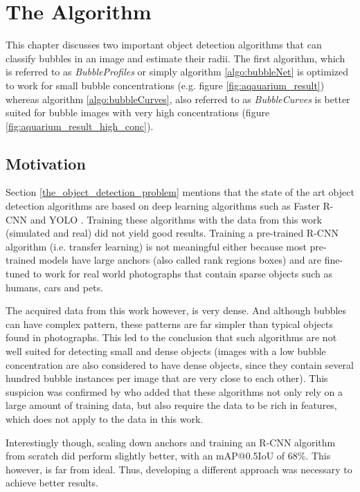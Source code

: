 \chapter{The Algorithm} \label{the_algorithm}
	This chapter discusses two important object detection algorithms that can classify bubbles in an image and estimate their radii. The first algorithm, which is referred to as \textit{BubbleProfiles} or simply algorithm \ref{algo:bubbleNet} is optimized to work for small bubble concentrations (e.g. figure \ref{fig:aqauarium_result}) whereas algorithm \ref{algo:bubbleCurves}, also referred to as \textit{BubbleCurves} is better suited for bubble images with very high concentrations (figure \ref{fig:aquarium_result_high_conc}).
		
	\section{Motivation}
		Section \ref{the_object_detection_problem} mentions that the state of the art object detection algorithms are based on deep learning algorithms such as Faster R-CNN \citep{FasterRCNN} and YOLO \citep{YOLO}. Training these algorithms with the data from this work (simulated and real) did not yield good results. Training a pre-trained R-CNN algorithm (i.e. transfer learning) is not meaningful either because most pre-trained models have large anchors (also called rank regions boxes) and are fine-tuned to work for real world photographs that contain sparse objects such as humans, cars and pets. 
		
		The acquired data from this work however, is very dense. And although bubbles can have complex pattern, these patterns are far simpler than typical objects found in photographs. 
		This led to the conclusion that such algorithms are not well suited for detecting small and dense objects (images with a low bubble concentration are also considered to have dense objects, since they contain several hundred bubble instances per image that are very close to each other). This suspicion was confirmed by \cite{Zhenhua2018} who added that these algorithms not only rely on a large amount of training data, but also require the data to be rich in features, which does not apply to the data in this work. 
		
	Interestingly though, scaling down anchors and training an R-CNN algorithm \citep{RCNN} from scratch did perform slightly better, with an mAP@0.5IoU of 68\%. This however, is far from ideal. Thus, developing a different approach was necessary to achieve better results. 
		
